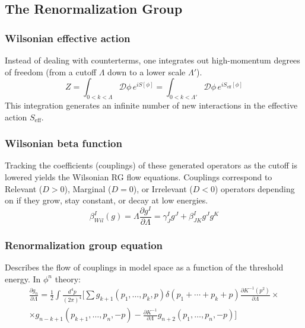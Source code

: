 \documentclass{article}
\begin{document}
\subsection{The Renormalization Group}
\subsubsection*{Wilsonian effective action}
Instead of dealing with counterterms, one integrates out high-momentum degrees of freedom (from a cutoff $\Lambda$ down to a lower scale $\Lambda'$). 
\begin{equation}
    Z = \int_{0 < k < \Lambda} \mathcal{D}\phi \, e^{iS[\phi]} = \int_{0 < k < \Lambda'} \mathcal{D}\phi \, e^{iS_{\text{eff}}[\phi]}
\end{equation}
This integration generates an infinite number of new interactions in the effective action $S_{\text{eff}}$.
\subsubsection*{Wilsonian beta function}
Tracking the coefficients (couplings) of these generated operators as the cutoff is lowered yields the Wilsonian RG flow equations. Couplings correspond to Relevant ($D > 0$), Marginal ($D = 0$), or Irrelevant ($D < 0$) operators depending on if they grow, stay constant, or decay at low energies.
\begin{equation}
    \beta_{Wil}^I(g) = \Lambda \frac{\partial g^I}{\partial \Lambda} = \gamma^I_J g^J + \beta^I_{JK}g^Jg^K
\end{equation}
\subsubsection*{Renormalization group equation}
Describes the flow of couplings in model space as a function of the threshold energy. In $\phi^n$ theory:
\begin{equation}
\begin{gathered}
    \frac{\partial g_n}{\partial \Lambda} = \frac{1}{2}\int \frac{d^4p}{(2\pi)^4} \Bigg[
        \sum
        g_{k+1}(p_1, \dots, p_k, p)\delta(p_1 + \cdots + p_k + p)\frac{\partial K^{-1}(p^2)}{\partial \Lambda} \times \\ \times g_{n-k+1}(p_{k+1}, \dots, p_n, -p) - \frac{\partial K^{-1}}{\partial \Lambda}g_{n+2}(p_1, \dots, p_n, -p)
    \Bigg]
\end{gathered}
\end{equation}
\end{document}
